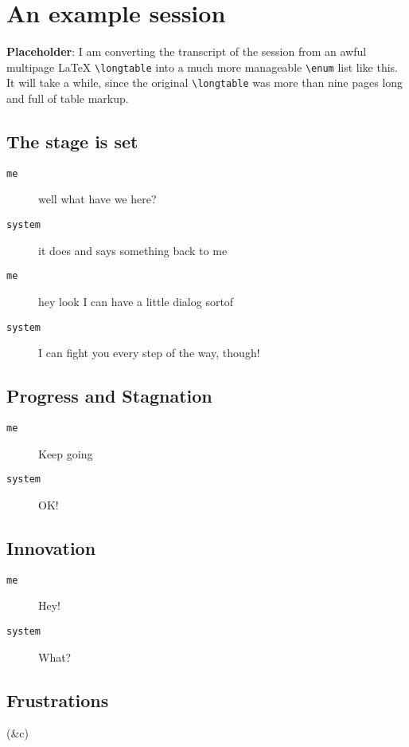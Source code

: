 \section{An example session}\hypertarget{an-example-session}{}\label{an-example-session}

\textbf{Placeholder}: I am converting the transcript of the session from an awful multipage LaTeX {\tt \textbackslash{}longtable} into a much more manageable {\tt \textbackslash{}enum} list like this. It will take a while, since the original {\tt \textbackslash{}longtable} was more than nine pages long and full of table markup.

\subsection{The stage is set}\hypertarget{the-stage-is-set}{}\label{the-stage-is-set}

\begin{description}
\item[{\tt me}] well what have we here?



\item[{\tt system}] it does and says something back to me



\item[{\tt me}] hey look I can have a little dialog sortof



\item[{\tt system}] I can fight you every step of the way, though!
\end{description}

\subsection{Progress and Stagnation}\hypertarget{progress-and-stagnation}{}\label{progress-and-stagnation}

\begin{description}
\item[{\tt me}] Keep going



\item[{\tt system}] OK!
\end{description}

\subsection{Innovation}\hypertarget{innovation}{}\label{innovation}

\begin{description}
\item[{\tt me}] Hey!



\item[{\tt system}] What?
\end{description}

\subsection{Frustrations}\hypertarget{frustrations}{}\label{frustrations}

(\&c)

